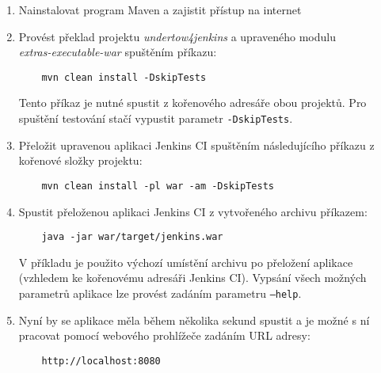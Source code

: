     \begin{enumerate}
        \item Nainstalovat program Maven a zajistit přístup na internet
        \item Provést překlad projektu \emph{undertow4jenkins} a upraveného modulu \\\emph{extras-executable-war}
            spuštěním příkazu: 

\vspace{-0.3cm}
\begin{verbatim}            
    mvn clean install -DskipTests
\end{verbatim}
\vspace{-0.3cm}

            Tento příkaz je nutné spustit z kořenového adresáře obou projektů. Pro spuštění testování
            stačí vypustit parametr \texttt{-DskipTests}.

        \item Přeložit upravenou aplikaci Jenkins CI spuštěním následujícího příkazu z kořenové
            složky projektu:

\vspace{-0.3cm}
\begin{verbatim}
    mvn clean install -pl war -am -DskipTests
\end{verbatim}
\vspace{-0.3cm}

        \item Spustit přeloženou aplikaci Jenkins CI z vytvořeného archivu příkazem:
\vspace{-0.3cm}
\begin{verbatim}
    java -jar war/target/jenkins.war
\end{verbatim}
\vspace{-0.3cm}
            
            V příkladu je použito výchozí umístění archivu po přeložení aplikace (vzhledem
            ke kořenovému adresáři Jenkins CI). Vypsání všech možných parametrů aplikace
            lze provést zadáním parametru \texttt{--help}.

        \item Nyní by se aplikace měla během několika sekund spustit a je možné s ní pracovat
            pomocí webového prohlížeče zadáním URL adresy:

\vspace{-0.3cm}
\begin{verbatim}
    http://localhost:8080
\end{verbatim}
    \end{enumerate}




